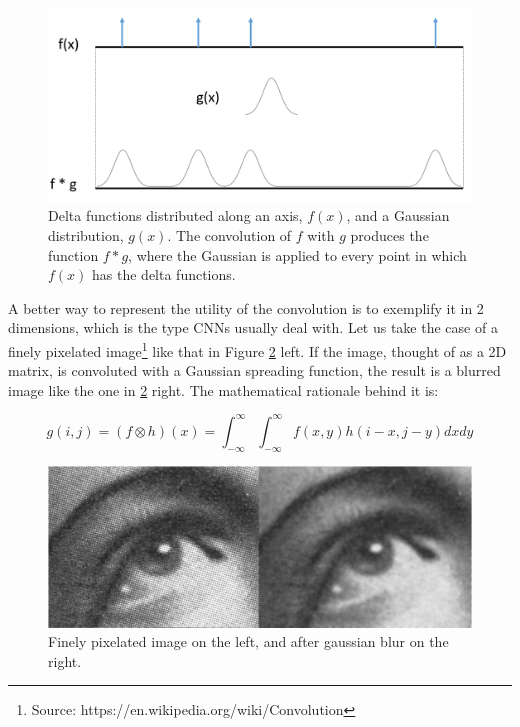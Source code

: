 \documentclass[../main.tex]{subfiles}
\begin{document}
\begin{figure}[H]
    \centering
    \includegraphics[width=0.9\linewidth]{images/1d_convolution_example.PNG}
    \caption{Delta functions distributed along an axis, $f(x)$, and a Gaussian distribution, $g(x)$. The convolution of $f$ with $g$ produces the function $f*g$, where the Gaussian is applied to every point in which $f(x)$ has the delta functions.}
    \label{fig:1d_convolution_example}
\end{figure}

A better way to represent the utility of the convolution is to exemplify it in 2 dimensions, which is the type CNNs usually deal with. Let us take the case of a finely pixelated image\footnote{Source: https://en.wikipedia.org/wiki/Convolution} like that in Figure \ref{fig:wiki_example_gaussian_blur} left. If the image, thought of as a 2D matrix, is convoluted with a Gaussian spreading function, the result is a blurred image like the one in \ref{fig:wiki_example_gaussian_blur} right. The mathematical rationale behind it is:

\begin{equation} \label{eqn:2D_conv_cont}
    g(i,j) = (f \otimes h)(x) = \int_{-\infty}^{\infty} \int_{-\infty}^{\infty} f(x,y) h(i-x,j-y) dxdy
\end{equation}

\begin{figure}[H]
    \centering
    \includegraphics[width=\linewidth]{images/wiki_example_gaussian_blur.jpg}
    \caption{Finely pixelated image on the left, and after gaussian blur on the right.}
    \label{fig:wiki_example_gaussian_blur}
\end{figure}
\end{document}
